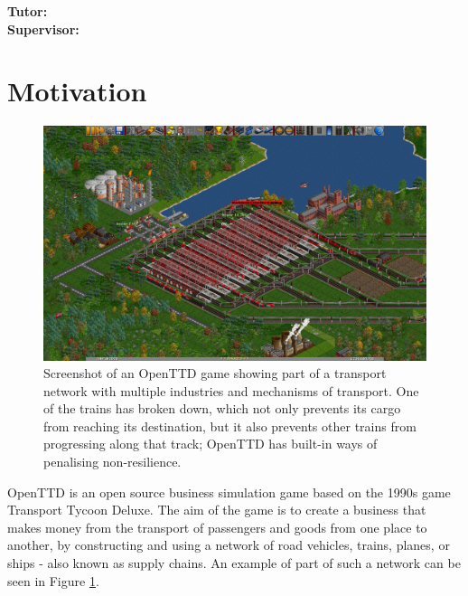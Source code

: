 \documentclass[a4paper,11pt]{article}
\begin{document}
\vfill
{\bf Tutor:} \tutor\\
{\bf Supervisor:} \supervisor
\newpage

\footruleheight{1pt}
\headruleheight{1pt}
\rhead{- \thepage}
\cfoot{}
%


\section{Motivation}

\begin{figure}[h]
\centering
\includegraphics[width=\textwidth]{transport-tycoon-screenshot.png}
\caption{Screenshot of an OpenTTD game showing part of a transport network with multiple industries and mechanisms of transport. One of the trains has broken down, which not only prevents its cargo from reaching its destination, but it also prevents other trains from progressing along that track; OpenTTD has built-in ways of penalising non-resilience.}
\label{fig:network}
\end{figure}

OpenTTD is an open source business simulation game based on the 1990s game Transport Tycoon Deluxe. The aim of the game is to create a business that makes money from the transport of passengers and goods from one place to another, by constructing and using a network of road vehicles, trains, planes, or ships - also known as supply chains. An example of part of such a network can be seen in Figure \ref{fig:network}.
\end{document}
